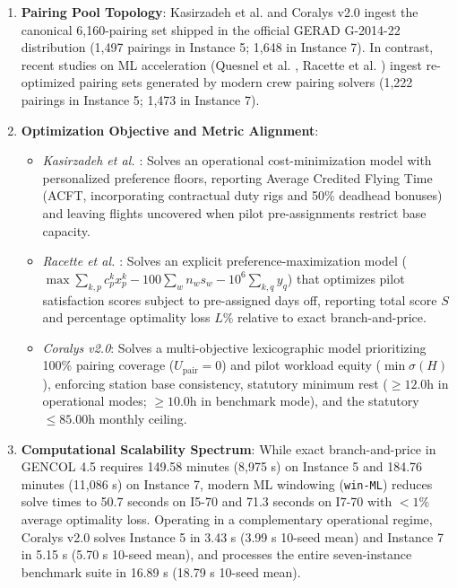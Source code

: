 \documentclass[journal]{IEEEtran}
\begin{document}
\begin{enumerate}
    \item \textbf{Pairing Pool Topology}: Kasirzadeh et al. \cite{kasirzadeh2017} and Coralys v2.0 ingest the canonical 6,160-pairing set shipped in the official GERAD G-2014-22 distribution (1,497 pairings in Instance 5; 1,648 in Instance 7). In contrast, recent studies on ML acceleration (Quesnel et al. \cite{quesnel2020}, Racette et al. \cite{racette2025}) ingest re-optimized pairing sets generated by modern crew pairing solvers (1,222 pairings in Instance 5; 1,473 in Instance 7).
    \item \textbf{Optimization Objective and Metric Alignment}: 
    \begin{itemize}
        \item \emph{Kasirzadeh et al. \cite{kasirzadeh2017}}: Solves an operational cost-minimization model with personalized preference floors, reporting Average Credited Flying Time (ACFT, incorporating contractual duty rigs and 50\% deadhead bonuses) and leaving flights uncovered when pilot pre-assignments restrict base capacity.
        \item \emph{Racette et al. \cite{racette2025}}: Solves an explicit preference-maximization model ($\max \sum_{k,p} c_p^k x_p^k - 100 \sum_w n_w s_w - 10^6 \sum_{k,q} y_q$) that optimizes pilot satisfaction scores subject to pre-assigned days off, reporting total score $S$ and percentage optimality loss $L\%$ relative to exact branch-and-price.
        \item \emph{Coralys v2.0}: Solves a multi-objective lexicographic model prioritizing 100\% pairing coverage ($U_{\text{pair}} = 0$) and pilot workload equity ($\min \sigma(H)$), enforcing station base consistency, statutory minimum rest ($\ge 12.0$h in operational modes; $\ge 10.0$h in benchmark mode), and the statutory $\le 85.00$h monthly ceiling.
    \end{itemize}
    \item \textbf{Computational Scalability Spectrum}: While exact branch-and-price in GENCOL 4.5 requires 149.58 minutes (8,975 s) on Instance 5 and 184.76 minutes (11,086 s) on Instance 7, modern ML windowing (\texttt{win-ML}) reduces solve times to 50.7 seconds on I5-70 and 71.3 seconds on I7-70 with $< 1\%$ average optimality loss. Operating in a complementary operational regime, Coralys v2.0 solves Instance 5 in 3.43 s (3.99 s 10-seed mean) and Instance 7 in 5.15 s (5.70 s 10-seed mean), and processes the entire seven-instance benchmark suite in 16.89 s (18.79 s 10-seed mean).
\end{enumerate}
\end{document}
